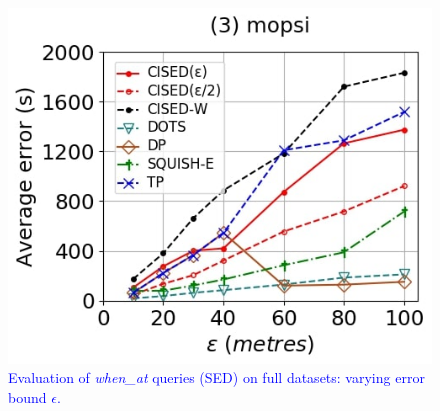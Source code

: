 {\begin{figure}[tb!]
	\includegraphics[scale = 0.250]{Figures/Exp-when-SED-error-epsilon-mopsi.jpg}
	\vspace{-1ex}
	\caption{\small \textcolor{blue}{Evaluation of \emph{when\_at} queries (SED) on full datasets: varying error bound $\epsilon$.}}
	\label{fig:query-when-sed-epsilon}
	\vspace{-1.0ex}
\end{figure}

}
